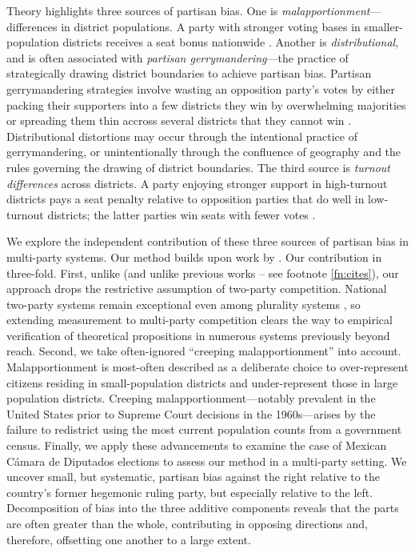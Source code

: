 \documentclass[letter,12pt]{article}
\begin{document}
Theory highlights three sources of partisan bias. One is \emph{malapportionment}---differences in district populations. A party with stronger voting bases in smaller-population districts receives a seat bonus nationwide \citep{johnston.2002,jackmanMeasuringBias1994}. Another is \emph{distributional}, and is often associated with \emph{partisan gerrymandering}---the practice of strategically drawing district boundaries to achieve partisan bias. Partisan gerrymandering strategies involve wasting an opposition party's votes by either packing their supporters into a few districts they win by overwhelming majorities or spreading them thin accross several districts that they cannot win \citep{owen.grofman.1988.partisangerrymandering,cox.katz.2002,engstrom2006redisttrictApsr}. Distributional distortions may occur through the intentional practice of gerrymandering, or unintentionally through the confluence of geography and the rules governing the drawing of district boundaries. The third source is \emph{turnout differences} across districts. A party enjoying stronger support in high-turnout districts pays a seat penalty relative to opposition parties that do well in low-turnout districts; the latter parties win seats with fewer votes \citep{campbellTurnoutBias1996,rosenstone.hansen.1993}.  

We explore the independent contribution of these three sources of partisan bias in multi-party systems. Our method builds upon work by \citet{grofman.etalBiasMalapp.1997}. Our contribution in three-fold. First, unlike \citeauthor{grofman.etalBiasMalapp.1997} (and unlike previous works -- see footnote \ref{fn:cites}), our approach drops the restrictive assumption of two-party competition. National two-party systems remain exceptional even among plurality systems \citep{cox.1997}, so extending measurement to multi-party competition clears the way to empirical verification of theoretical propositions in numerous systems previously beyond reach. Second, we take often-ignored ``creeping malapportionment'' \citep{johnston.2002} into account. Malapportionment is most-often described as a deliberate choice to over-represent citizens residing in small-population districts and under-represent those in large population districts. Creeping malapportionment---notably prevalent in the United States prior to Supreme Court decisions in the 1960s---arises by the failure to redistrict using the most current population counts from a government census. Finally, we apply these advancements to examine the case of Mexican C\'amara de Diputados elections to assess our method in a multi-party setting. We uncover small, but systematic, partisan bias against the right relative to the country's former hegemonic ruling party, but especially relative to the left. Decomposition of bias into the three additive components reveals that the parts are often greater than the whole, contributing in opposing directions and, therefore, offsetting one another to a large extent. 
\end{document}
